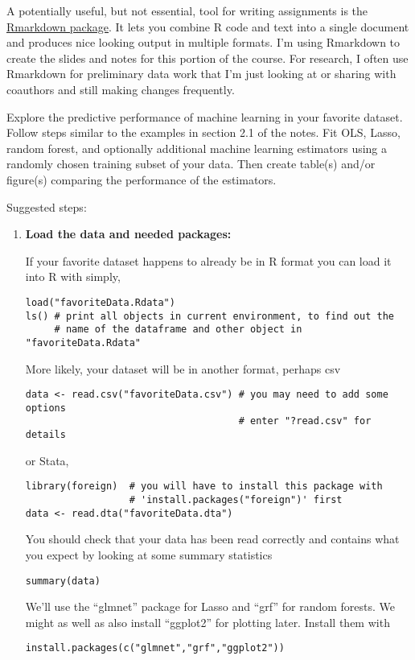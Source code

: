A potentially useful, but not essential, tool for writing assignments
is the \href{http://rmarkdown.rstudio.com/}{Rmarkdown package}. It
lets you combine R code and text into a single document and produces
nice looking output in multiple formats. I'm using Rmarkdown to create
the slides and notes for this portion of the course. For research, I
often use Rmarkdown for preliminary data work that I'm just looking at
or sharing with coauthors and still making changes frequently.

\begin{problem}
  Explore the predictive performance of machine learning in your
  favorite dataset. Follow steps similar to the examples in section
  2.1 of the notes. Fit OLS, Lasso, random forest, and optionally
  additional machine learning estimators using a randomly chosen
  training subset of your data. Then create table(s) and/or figure(s)
  comparing the performance of the estimators.

  Suggested steps:
  \begin{enumerate}
  \item \textbf{Load the data and needed packages:}
    
    If your favorite dataset happens to already be in R format you can
    load it into R with simply,
\begin{lstlisting}
load("favoriteData.Rdata")
ls() # print all objects in current environment, to find out the 
     # name of the dataframe and other object in "favoriteData.Rdata"
\end{lstlisting}
    More likely, your dataset will be in another format, perhaps csv
\begin{lstlisting}
data <- read.csv("favoriteData.csv") # you may need to add some options
                                     # enter "?read.csv" for details
\end{lstlisting}
    or Stata,
\begin{lstlisting}
library(foreign)  # you will have to install this package with
                  # 'install.packages("foreign")' first
data <- read.dta("favoriteData.dta")
\end{lstlisting}
    You should check that your data has been read correctly and contains
    what you expect by looking at some summary statistics
\begin{lstlisting}
summary(data)
\end{lstlisting}
    We'll use the ``glmnet'' package for Lasso and ``grf'' for random
    forests. We might as well as also install ``ggplot2'' for plotting
    later. Install them with
\begin{lstlisting}
install.packages(c("glmnet","grf","ggplot2")) 


\end{lstlisting}
\end{enumerate}
\end{problem}
